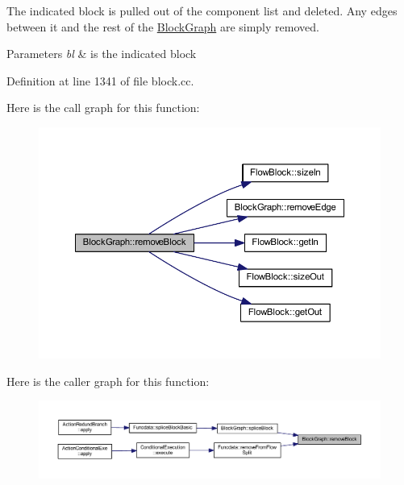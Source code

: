 The indicated block is pulled out of the component list and deleted. Any edges between it and the rest of the \mbox{\hyperlink{class_block_graph}{Block\+Graph}} are simply removed. 
\begin{DoxyParams}{Parameters}
{\em bl} & is the indicated block \\
\hline
\end{DoxyParams}


Definition at line 1341 of file block.\+cc.

Here is the call graph for this function\+:
\nopagebreak
\begin{figure}[H]
\begin{center}
\leavevmode
\includegraphics[width=350pt]{class_block_graph_a566cbe393f781703c640a691e27a4f90_cgraph}
\end{center}
\end{figure}
Here is the caller graph for this function\+:
\nopagebreak
\begin{figure}[H]
\begin{center}
\leavevmode
\includegraphics[width=350pt]{class_block_graph_a566cbe393f781703c640a691e27a4f90_icgraph}
\end{center}
\end{figure}
\mbox{\label{class_block_graph_a2fe87e9f6a5a250a09869028bf1bb11d}} 
